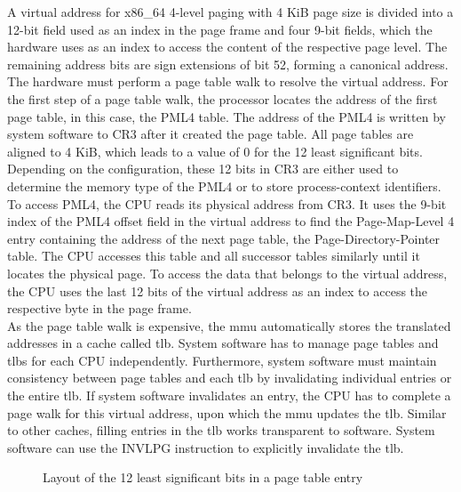 A virtual address for x86\_64 4-level paging with 4 KiB page size is divided
into a 12-bit field used as an index in the page frame and four 9-bit fields,
which the hardware uses as an index to access the content of the respective page
level. The remaining address bits are sign extensions of bit 52, forming a
canonical address. The hardware must perform a page table walk to resolve the
virtual address. For the first step of a page table walk, the processor locates
the address of the first page table, in this case, the PML4 table. The address
of the PML4 is written by system software to CR3 after it created the page
table. All page tables are aligned to 4 KiB, which leads to a value of 0 for the
12 least significant bits. Depending on the configuration, these 12 bits in CR3
are either used to determine the memory type of the PML4 or to store
process-context identifiers. To access PML4, the CPU reads its physical address
from CR3. It uses the 9-bit index of the PML4 offset field in the virtual
address to find the Page-Map-Level 4 entry containing the address of the next
page table, the Page-Directory-Pointer table. The CPU accesses this table and
all successor tables similarly until it locates the physical page. To access the
data that belongs to the virtual address, the CPU uses the last 12 bits of the
virtual address as an index to access the respective byte in the page frame. \\

As the page table walk is expensive, the \gls{mmu} automatically stores the
translated addresses in a cache called \gls{tlb}. System software has to manage
page tables and \glspl{tlb} for each CPU independently. Furthermore, system
software must maintain consistency between page tables and each \gls{tlb} by
invalidating individual entries or the entire \gls{tlb}. If system software
invalidates an entry, the CPU has to complete a page walk for this virtual
address, upon which the \gls{mmu} updates the \gls{tlb}. Similar to other
caches, filling entries in the \gls{tlb} works transparent to software. System
software can use the INVLPG instruction to explicitly invalidate the \gls{tlb}.

\begin{figure}
  \begin{center}
    
    \caption{Layout of the 12 least significant bits in a page table entry}
    \label{fig:state:technical:paging_rights}
  \end{center}
\end{figure}

